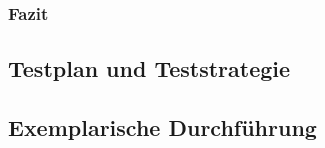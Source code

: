 \subsubsection{Fazit}

\subsection{Testplan und Teststrategie}


\subsection{Exemplarische Durchführung}